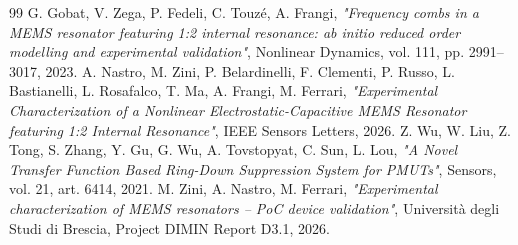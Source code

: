 \documentclass[11pt,a4paper]{article}
\begin{document}
\begin{thebibliography}{99}
 G. Gobat, V. Zega, P. Fedeli, C. Touzé, A. Frangi, \textit{"Frequency combs in a MEMS resonator featuring 1:2 internal resonance: ab initio reduced order modelling and experimental validation"}, Nonlinear Dynamics, vol. 111, pp. 2991--3017, 2023.
 A. Nastro, M. Zini, P. Belardinelli, F. Clementi, P. Russo, L. Bastianelli, L. Rosafalco, T. Ma, A. Frangi, M. Ferrari, \textit{"Experimental Characterization of a Nonlinear Electrostatic-Capacitive MEMS Resonator featuring 1:2 Internal Resonance"}, IEEE Sensors Letters, 2026.
 Z. Wu, W. Liu, Z. Tong, S. Zhang, Y. Gu, G. Wu, A. Tovstopyat, C. Sun, L. Lou, \textit{"A Novel Transfer Function Based Ring-Down Suppression System for PMUTs"}, Sensors, vol. 21, art. 6414, 2021.
 M. Zini, A. Nastro, M. Ferrari, \textit{"Experimental characterization of MEMS resonators -- PoC device validation"}, Università degli Studi di Brescia, Project DIMIN Report D3.1, 2026.
\end{thebibliography}
\end{document}
